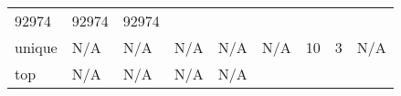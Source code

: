 \begin{longtable}[]{@{}lllllllll@{}}
\begin{minipage}[t]{0.09\columnwidth}
92974\strut
\end{minipage} & \begin{minipage}[t]{0.08\columnwidth}\raggedright
92974\strut
\end{minipage} & \begin{minipage}[t]{0.11\columnwidth}\raggedright
92974\strut
\end{minipage}\tabularnewline
\begin{minipage}[t]{0.05\columnwidth}\raggedright
unique\strut
\end{minipage} & \begin{minipage}[t]{0.08\columnwidth}\raggedright
N/A\strut
\end{minipage} & \begin{minipage}[t]{0.09\columnwidth}\raggedright
N/A\strut
\end{minipage} & \begin{minipage}[t]{0.09\columnwidth}\raggedright
N/A\strut
\end{minipage} & \begin{minipage}[t]{0.08\columnwidth}\raggedright
N/A\strut
\end{minipage} & \begin{minipage}[t]{0.09\columnwidth}\raggedright
N/A\strut
\end{minipage} & \begin{minipage}[t]{0.09\columnwidth}\raggedright
10\strut
\end{minipage} & \begin{minipage}[t]{0.08\columnwidth}\raggedright
3\strut
\end{minipage} & \begin{minipage}[t]{0.11\columnwidth}\raggedright
N/A\strut
\end{minipage}\tabularnewline
\begin{minipage}[t]{0.05\columnwidth}\raggedright
top\strut
\end{minipage} & \begin{minipage}[t]{0.08\columnwidth}\raggedright
N/A\strut
\end{minipage} & \begin{minipage}[t]{0.09\columnwidth}\raggedright
N/A\strut
\end{minipage} & \begin{minipage}[t]{0.09\columnwidth}\raggedright
N/A\strut
\end{minipage} & \begin{minipage}[t]{0.08\columnwidth}\raggedright
N/A\strut
\end{minipage} & \begin{minipage}[t]{0.09\columnwidth}\raggedright

\end{minipage}
\end{longtable}
